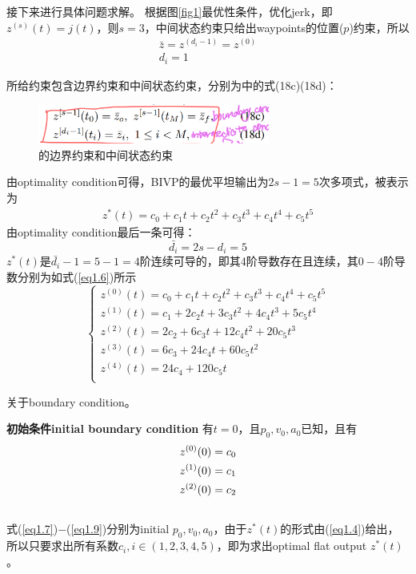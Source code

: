 \documentclass[40pt,a4paper,UTF8,twocolumn]{ctexart}%
\numberwithin{equation}{section}
\begin{document}
    接下来进行具体问题求解。
根据图\ref{fig1}最优性条件，优化jerk，即$z^{(s)}(t)=j(t)$，则$s=3$，中间状态约束只给出waypoints的位置($p$)约束，所以
\begin{gather} %
    \bar{z}=z^{(d_i-1)}=z^{(0)} \\
    d_i=1
\end{gather}

所给约束包含边界约束和中间状态约束，分别为\cite{ref1}中的式(18c)(18d)：
\begin{figure}[H]
    \centering
    \includegraphics[width=3.0in]{ch5_2.png} 
    \caption{\cite{ref1}的边界约束和中间状态约束}
    \label{fig2} %
\end{figure}

由optimality condition可得，BIVP的最优平坦输出为$2s-1=5$次多项式，被表示为
\begin{align}
    z^*(t) = c_0+c_1t+c_2t^2+c_3t^3+c_4t^4+c_5t^5 \label{eq1.4}
\end{align}
由optimality condition最后一条可得：
\begin{equation}
    \bar{d_i}=2s-d_i=5    
\end{equation}
$z^*(t)$是$\bar{d_i}-1=5-1=4$阶连续可导的，即其4阶导数存在且连续，其$0-4$阶导数分别为如式(\ref{eq1.6})所示
\begin{equation}
\left\{
    \begin{array}{l}
        z^{(0)}(t)=c_0+c_1t+c_2t^2+c_3t^3+c_4t^4+c_5t^5\\
        z^{(1)}(t)=c_1+2c_2t+3c_3t^2+4c_4t^3+5c_5t^4\\
        z^{(2)}(t)=2c_2+6c_3t+12c_4t^2+20c_5t^3\\
        z^{(3)}(t)=6c_3+24c_4t+60c_5t^2\\
        z^{(4)}(t)=24c_4+120c_5t\\
    \end{array}
\right.
\label{eq1.6} %
\end{equation}

关于boundary condition。

\textbf{初始条件initial boundary condition}
有$t=0$，且$p_0,v_0,a_0$已知，且有
\begin{gather}
    z^{(0)}(0)=c_0 \label{eq1.7} \\
    z^{(1)}(0)=c_1 \label{eq1.8}\\
    z^{(2)}(0)=c_2 \label{eq1.9}\\ 
    \notag %
\end{gather}
式(\ref{eq1.7})$-$(\ref{eq1.9})分别为initial $p_0,v_0,a_0$，由于$z^*(t)$的形式由(\ref{eq1.4})给出，
所以只要求出所有系数$c_i,i\in(1,2,3,4,5)$，即为求出optimal flat output $z^*(t)$。
\end{document}
